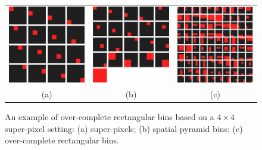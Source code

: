 \begin{figure}
  \centering
  \begin{tabular}{ccc}
    \includegraphics[width=0.27\linewidth]{figs/smartpooling/basebins.png} & %
    \includegraphics[width=0.27\linewidth]{figs/smartpooling/spmbins.png} & %
    \includegraphics[width=0.27\linewidth]{figs/smartpooling/ocbins.png}\\
    (a) & (b) & (c)
  \end{tabular}
  \caption{An example of over-complete rectangular bins based on a $4\times 4$ super-pixel setting: (a) super-pixels; (b) spatial pyramid bins; (c) over-complete rectangular bins.}\label{fig:ocbins} 
\end{figure}

